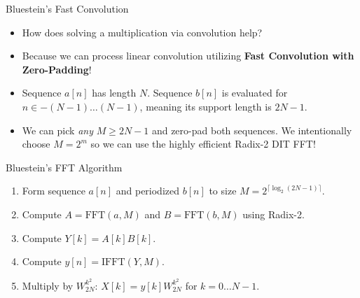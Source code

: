 \begin{frame}{Bluestein's Fast Convolution}
    \begin{itemize}
        \item How does solving a multiplication via convolution help?
        \item Because we can process linear convolution utilizing \textbf{Fast Convolution with Zero-Padding}!
        \item Sequence $a[n]$ has length $N$. Sequence $b[n]$ is evaluated for $n \in -(N-1) \dots (N-1)$, meaning its support length is $2N-1$.
        \item We can pick \textit{any} $M \ge 2N-1$ and zero-pad both sequences. We intentionally choose $M=2^m$ so we can use the highly efficient Radix-2 DIT FFT!
    \end{itemize}
    \vspace{0.4cm}
    \begin{algorithmbox}{Bluestein's FFT Algorithm}
        \begin{enumerate}
            \item Form sequence $a[n]$ and periodized $b[n]$ to size $M = 2^{\lceil \log_2(2N-1) \rceil}$.
            \item Compute $A = \text{FFT}(a, M)$ and $B = \text{FFT}(b, M)$ using Radix-2.
            \item Compute $Y[k] = A[k] B[k]$.
            \item Compute $y[n] = \text{IFFT}(Y, M)$.
            \item Multiply by $W_{2N}^{k^2}$: $X[k] = y[k] W_{2N}^{k^2}$ for $k=0 \dots N-1$.
        \end{enumerate}
    \end{algorithmbox}
\end{frame}


